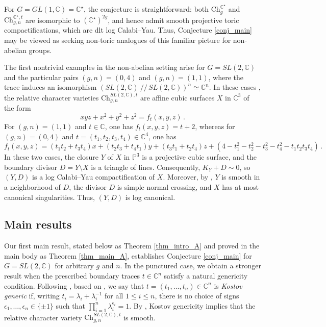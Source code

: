 \documentclass[12pt,letterpaper, reqno]{amsart}
\theoremstyle{defstyle} \newtheorem{definition}[theorem]{Definition}
\theoremstyle{remark}
\numberwithin{equation}{section}
\numberwithin{figure}{section}
\newcommand{\CC} {\mathbb{C}}
\newcommand{\PP} {\mathbb{P}}
\begin{document}
For $G=GL(1,\CC)=\CC^\star$, the 
conjecture is straightforward: both $\mathrm{Ch}_g^{\CC^\star}$ and $\mathrm{Ch}_{g,n}^{\CC^\star,t}$ are isomorphic to $(\CC^\star)^{2g}$, and hence admit smooth projective toric compactifications, which are dlt log Calabi--Yau. Thus, Conjecture \ref{conj_main} may be viewed as seeking non-toric analogues of this familiar picture for non-abelian groups.

The first nontrivial examples in the non-abelian setting arise for $G=SL(2,\CC)$ and the particular pairs $(g,n)=(0,4)$ and $(g,n)=(1,1)$, where the trace induces an isomorphism
$(SL(2,\CC) \ /\!/\, SL(2,\CC))^n \simeq \CC^n$. In these cases \cite{fricke_klein, goldman2010affine}, the relative character varieties $\mathrm{Ch}_{g,n}^{SL(2,\CC),t}$ are affine cubic surfaces $X$ in $\CC^3$ of the form
\[xyz+x^2+y^2+z^2=f_t(x,y,z)\,.\]
For  $(g,n)=(1,1)$ and $t\in \CC$, one has $f_t(x,y,z)=t+2$, whereas for $(g,n)=(0,4)$ and $t=(t_1,t_2,t_3,t_4)\in\CC^4$, one has
\[ f_t(x,y,z)= (t_1t_2 +t_3t_4)x+(t_2t_3 +t_4t_1)y +(t_3t_1+t_2t_4)z +(4-t_1^2-t_2^2-t_3^2-t_4^2-t_1t_2t_3t_4) \,.\]
In these two cases, the closure $Y$ of $X$ in $\PP^3$ is a projective cubic surface, and the boundary divisor $D=Y\setminus X$ is a triangle of lines. Consequently, $K_Y+D \sim 0$, so $(Y,D)$ is a log Calabi--Yau compactification of $X$. Moreover, by \cite[Theorem 1]{goldman2010affine}, $Y$ is smooth in a neighborhood of $D$, the divisor $D$ is simple normal crossing, and $X$ has at most canonical singularities. Thus, $(Y,D)$ is log canonical.


\subsection{Main results}
\label{sec_intro_main_results}

Our first main result, stated below as Theorem \ref{thm_intro_A} and proved in the main body as Theorem \ref{thm_main_A}, establishes Conjecture \ref{conj_main} for $G=SL(2,\CC)$ for arbitrary $g$ and $n$. In the punctured case, we obtain a stronger result when the prescribed boundary traces $t\in\CC^n$ satisfy a natural genericity condition. Following \cite[Condition 4.3]{simpson2016dual}, based on \cite{Kostov}, we say that $t=(t_1,\ldots,t_n)\in\CC^n$ is \emph{Kostov generic} if, writing
$t_i=\lambda_i+\lambda_i^{-1}$ for all $1\le i\le n$,
there is no choice of signs $\epsilon_1,\ldots,\epsilon_n\in \{\pm1\}$ such that
$
\prod_{i=1}^n \lambda_i^{\epsilon_i}=1$. 
By \cite[Proposition 4.5]{simpson2016dual}, Kostov genericity implies that the relative character variety $\mathrm{Ch}_{g,n}^{SL(2,\CC),t}$ is smooth.
\end{document}
